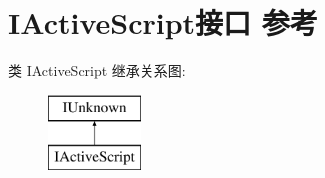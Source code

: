 \hypertarget{interface_i_active_script}{}\section{I\+Active\+Script接口 参考}
\label{interface_i_active_script}
类 I\+Active\+Script 继承关系图\+:\begin{figure}[H]
\begin{center}
\leavevmode
\includegraphics[height=2.000000cm]{interface_i_active_script}
\end{center}
\end{figure}

